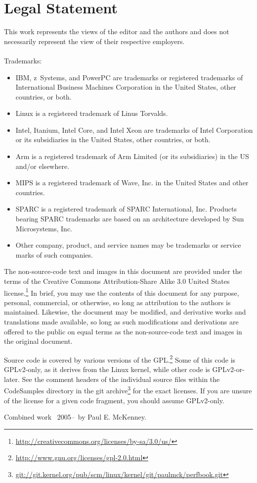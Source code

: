 
\section*{Legal Statement}

This work represents the views of the editor and the authors and does not
necessarily represent the view of their respective employers. \\
\\
Trademarks:
\begin{itemize}
\item	IBM, z~Systems, and PowerPC are trademarks or registered trademarks
	of International Business Machines Corporation in the United
	States, other countries, or both.
\item	Linux is a registered trademark of Linus Torvalds.
\item	Intel, Itanium, Intel Core, and Intel Xeon are trademarks
	of Intel Corporation or its subsidiaries in the United States,
	other countries, or both.
\item	Arm is a registered trademark of Arm Limited (or its subsidiaries)
	in the US and/or elsewhere.
\item	MIPS is a registered trademark of Wave, Inc. in the United States
	and other countries.
\item	SPARC is a registered trademark of SPARC International, Inc.
	Products bearing SPARC trademarks are based on an architecture
	developed by Sun Microsystems, Inc.
\item	Other company, product, and service names may be trademarks or
	service marks of such companies.
\end{itemize}

The non-source-code text and images in this document are provided under
the terms of the Creative Commons Attribution-Share Alike 3.0 United
States license.\footnote{
	\url{http://creativecommons.org/licenses/by-sa/3.0/us/}}
In brief, you may use the contents of this document for any purpose,
personal, commercial, or otherwise, so long as attribution to the
authors is maintained.  Likewise, the document may be modified,
and derivative works and translations made available, so long as
such modifications and derivations are offered to the public on equal
terms as the non-source-code text and images in the original document.

Source code is covered by various versions of the GPL.\footnote{
	\url{http://www.gnu.org/licenses/gpl-2.0.html}}
Some of this code is GPLv2-only, as it derives from the Linux kernel,
while other code is GPLv2-or-later.
See the comment headers of the individual source files within the
CodeSamples directory in the git archive\footnote{
	\url{git://git.kernel.org/pub/scm/linux/kernel/git/paulmck/perfbook.git}}
for the exact licenses.
If you are unsure of the license for a given code fragment,
you should assume GPLv2-only.

Combined work {\textcopyright}~2005--\commityear\ by Paul E. McKenney.
